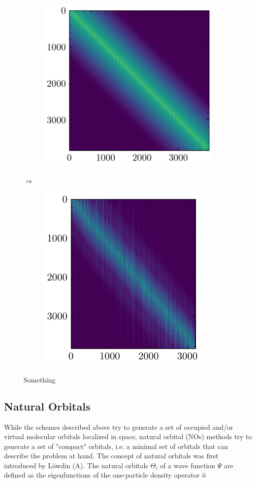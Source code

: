 \begin{figure}[h]
\begin{subfigure}{0.5\linewidth}
\centering
\includegraphics[scale=1.0]{densityV}
\end{subfigure}
$\Longrightarrow$
\begin{subfigure}{0.4\linewidth}
\centering
\includegraphics[scale=1.0]{choleskyV}
\end{subfigure}%
\caption{Something}
\end{figure} 

\subsection{Natural Orbitals}

While the schemes described above try to generate a set of occupied and/or virtual molecular orbitals localized in space, natural orbital (NOs) methods try to generate a set of "compact" orbitals, i.e. a minimal set of orbitals that can describe the problem at hand. The concept of natural orbitals was first introduced by Löwdin (A). The natural orbitals $\Theta_i$ of a wave function $\Psi$ are defined as the eigenfunctions of the one-particle density operator $\hat{n}$

